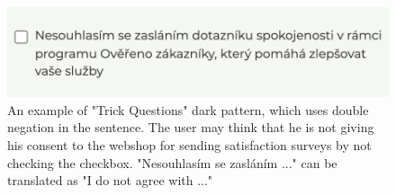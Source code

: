     \begin{figure}[ht]
        \centering
        \includegraphics[width=0.7\linewidth]{media/levnelyze.cz-heureka.png}
        \caption{An example of "Trick Questions" dark pattern, which uses double negation in the sentence. The user may think that he is not giving his consent to the webshop for sending satisfaction surveys by not checking the checkbox. "Nesouhlasím  se zasláním ..." can be translated as "I do not agree with ..."}
        \label{fig:good-reviews}
    \end{figure}